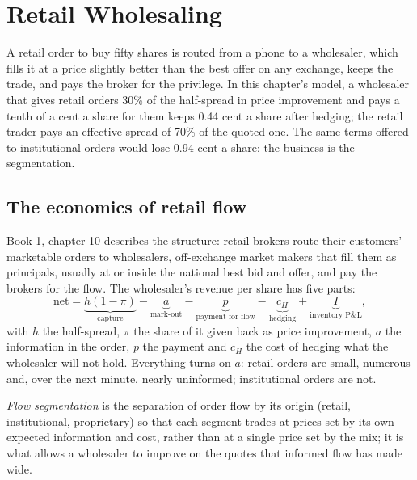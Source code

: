 \chapter{Retail Wholesaling}\label{ch:hf:retail-wholesaling}

A retail order to buy fifty shares is routed from a phone to a wholesaler, which fills it at a price slightly better than the best offer on any
exchange, keeps the trade, and pays the broker for the privilege. In this chapter's model, a wholesaler that gives retail orders 30\% of the
half-spread in price improvement and pays a tenth of a cent a share for them keeps 0.44 cent a share after hedging; the retail trader pays an
effective spread of 70\% of the quoted one. The same terms offered to institutional orders would lose 0.94 cent a share: the business is the
segmentation.

\section{The economics of retail flow}

Book 1, chapter 10 describes the structure: retail brokers route their customers' marketable orders to wholesalers, off-exchange market makers
that fill them as principals, usually at or inside the national best bid and offer, and pay the brokers for the flow. The wholesaler's
revenue per share has five parts:
\[
\text{net}=\underbrace{h(1-\pi)}_{\text{capture}}-\underbrace{a}_{\text{mark-out}}-\underbrace{p}_{\text{payment for flow}}
-\underbrace{c_H}_{\text{hedging}}+\underbrace{I}_{\text{inventory P\&L}},
\]
with $h$ the half-spread, $\pi$ the share of it given back as price improvement, $a$ the information in the order, $p$ the payment and $c_H$ the
cost of hedging what the wholesaler will not hold. Everything turns on $a$: retail orders are small, numerous and, over the next minute, nearly
uninformed; institutional orders are not.

\begin{definition}\label{def:hf:retail-wholesaling:segmentation}
\emph{Flow segmentation} is the separation of order flow by its origin (retail, institutional, proprietary) so that each
segment trades at prices set by its own expected information and cost, rather than at a single price set by the mix; it is what allows a
wholesaler to improve on the quotes that informed flow has made wide.
\end{definition}

